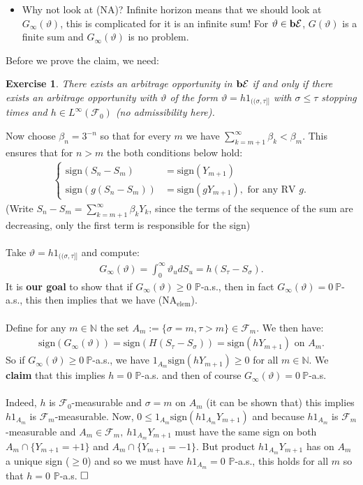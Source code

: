 \documentclass[12pt,a4paper, twoside]{article}
\newtheorem{exe}{Exercise}[section]
\theoremstyle{definition}
\newcommand{\PP}{\mathbb{P}} %
\newcommand{\simple}{\textbf{\text{b}}\mathcal{E}}
\newcommand{\sign}{\text{sign}}
\begin{document}
\begin{itemize}
\item Why not look at (NA)? Infinite horizon means that we should look at $G_\infty ( \vartheta)$, this is complicated for it is an infinite sum! For $\vartheta \in \simple$, $G( \vartheta)$ is a finite sum and $G_\infty( \vartheta)$ is no problem. 
\end{itemize}
Before we prove the claim, we need:
\begin{exe} There exists an arbitrage opportunity in $\simple$ if and only if there exists an arbitrage opportunity with $\vartheta$ of the form $\vartheta = h 1_{(\!(\sigma, \tau ]\!]}$ with $\sigma \leq \tau$ stopping times and $h \in L^\infty ( \mathcal{F}_0)$ (no admissibility here). 
\end{exe}
Now choose $\beta_n = 3^{-n}$ so that for every $m$ we have $\sum_{k=m+1}^\infty \beta_k < \beta_m$. This ensures that for $n >m$ the both conditions below hold:
\begin{align*}
\begin{cases} \sign(S_n-S_m)&= \sign(Y_{m+1}) \\
\sign(g(S_n-S_m))&= \sign(gY_{m+1}), \text{ for any RV } g. 
\end{cases}
\end{align*}
(Write $S_n-S_m = \sum_{k=m+1}^\infty \beta_k Y_k$, since the terms of the sequence of the sum are decreasing, only the first term is responsible for the sign)\\
\\
Take $\vartheta = h 1_{(\!( \sigma, \tau ]\!]}$ and compute: 
\begin{align*}
G_\infty ( \vartheta) = \int_0^\infty \vartheta_u d S_u = h ( S_\tau-S_\sigma).  
\end{align*}
It is \textbf{our goal} to show that if $G_\infty( \vartheta) \geq 0$ $\PP$-a.s., then in fact $G_\infty( \vartheta)=0 \ \PP$-a.s., this then implies that we have (NA$_\text{elem}$). \\
\\
Define for any $m \in \mathbb{N}$ the set $A_m:= \{ \sigma = m, \tau > m \} \in \mathcal{F}_m$. We then have: 
\begin{align*}
\sign(G_\infty( \vartheta))= \sign(H(S_\tau-S_\sigma)) = \sign(hY_{m+1}) \text{ on } A_m. 
\end{align*}
So if $G_\infty ( \vartheta) \geq 0 \ \PP$-a.s., we have $1_{A_m} \sign(hY_{m+1}) \geq 0$ for all $m \in \mathbb{N}$. We \textbf{claim} that this implies $h=0$ $\PP$-a.s. and then of course $G_\infty ( \vartheta)=0 \ \PP$-a.s. \\
\\
Indeed, $h$ is $\mathcal{F}_0$-measurable and $\sigma=m$ on $A_m$ (it can be shown that) this implies $h1_{A_m}$ is $\mathcal{F}_m$-measurable. Now, $0 \leq 1_{A_m} \sign(h1_{A_m}Y_{m+1})$ and because $h1_{A_m}$ is $\mathcal{F}_m$-measurable and $A_m \in \mathcal{F}_m, \ h 1_{A_m} Y_{m+1}$ must have the same sign on both $A_m \cap \{Y_{m+1}=+1\}$ and $A_m \cap \{Y_{m+1}=-1\}.$ But product $h1_{A_m} Y_{m+1}$ has on $A_m$ a unique sign ($ \geq 0$) and so we must have $h1_{A_m}=0$ $\PP$-a.s., this holds for all $m$ so that $h=0$ $\PP$-a.s. $\hfill \Box$
\newpage
\end{document}

